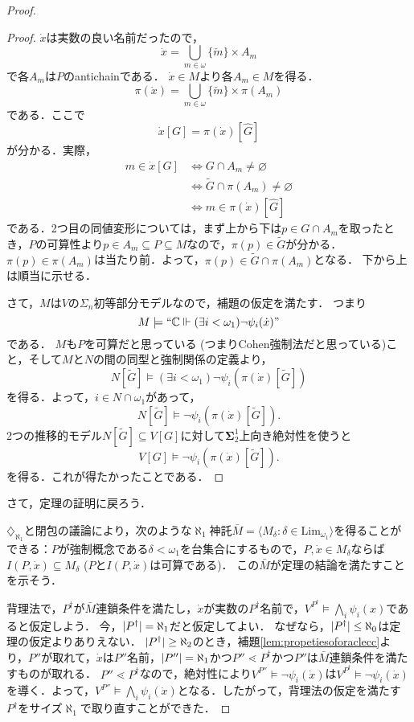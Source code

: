 \documentclass[uplatex]{jsarticle}
\newcommand{\C}{\mathbb{C}}
\newcommand{\boldsig}{\boldsymbol{\Sigma}}
\newcommand\forces{\Vdash}
\newcommand{\Limone}{\mathrm{Lim}_{\omega_1}}
\newcommand{\seq}[1]{{\langle#1\rangle}}
\DeclarePairedDelimiter\abs{\lvert}{\rvert}
\renewcommand\emptyset{\varnothing}
\renewcommand\subset{\subseteq}
\theoremstyle{definition}
\begin{document}
\begin{proof}
\begin{proof}
			$\dot{x}$は実数の良い名前だったので，
			\[
			\dot{x} = \bigcup_{m \in \omega} \{\check{m}\} \times A_m
			\]
			で各$A_m$は$P$のantichainである．
			$\dot{x} \in M$より各$A_m \in M$を得る．
			\[
				\pi(\dot{x}) = \bigcup_{m \in \omega} \{\check{m}\} \times \pi(A_m)
			\]
			である．ここで
			\[
			\dot{x}[G] = \pi(\dot{x})[\hat{G}]
			\]
			が分かる．実際，
			\begin{align*}
			m \in \dot{x}[G] &\iff G \cap A_m \ne \emptyset \\
			&\iff \tilde{G} \cap \pi(A_m) \ne \emptyset \\
			&\iff m \in \pi(\dot{x})[\hat{G}]
			\end{align*}
			である．2つ目の同値変形については，まず上から下は$p \in G \cap A_m$を取ったとき，$P$の可算性より$p \in A_m \subset P \subset M$なので，$\pi(p) \in \tilde{G}$が分かる．$\pi(p) \in \pi(A_m)$は当たり前．よって，$\pi(p) \in \tilde{G} \cap \pi(A_m)$となる．
			下から上は順当に示せる．
			
			さて，$M$は$V$の$\Sigma_n$初等部分モデルなので，補題の仮定を満たす．
			つまり\[M \models ``\C \forces (\exists i < \omega_1)\neg \psi_i(\dot{x})"\]である．
			$M$も$P$を可算だと思っている (つまりCohen強制法だと思っている)こと，そして$M$と$N$の間の同型と強制関係の定義より，
			\[
			N[\tilde{G}] \models (\exists i < \omega_1)\neg \psi_i(\pi(\dot{x})[\tilde{G}])
			\]
			を得る．よって，$i \in N \cap \omega_1$があって，
			\[
			N[\tilde{G}] \models \neg \psi_i(\pi(\dot{x})[\tilde{G}]).
			\]
			2つの推移的モデル$N[\tilde{G}] \subset V[G]$に対して$\boldsig^1_2$上向き絶対性を使うと
			\[
			V[G] \models \neg \psi_i(\pi(\dot{x})[\tilde{G}]).
			\]
			を得る．これが得たかったことである．
		\end{proof}
		
		\renewcommand\qedsymbol{$\square$}
		
		さて，定理の証明に戻ろう．
		
		$\diamondsuit_{\aleph_1}$と閉包の議論により，次のような$\aleph_1$神託$\bar{M} = \seq{M_\delta : \delta \in \Limone}$を得ることができる：$P$が強制概念である$\delta < \omega_1$を台集合にするもので，$P, \dot{x} \in M_\delta$ならば$I(P, \dot{x}) \subset M_\delta$ ($P$と$I(P, \dot{x})$は可算である)．
		この$\bar{M}$が定理の結論を満たすことを示そう．
		
		背理法で，$P^\dagger$が$\bar{M}$連鎖条件を満たし，$\dot{x}$が実数の$P^\dagger$名前で，$V^{P^\dagger} \models \bigwedge_i \psi_i(x)$であると仮定しよう．
		今，$\abs{P^\dagger} = \aleph_1$だと仮定してよい．
		なぜなら，$\abs{P^\dagger} \le \aleph_0$は定理の仮定よりありえない．
		$\abs{P^\dagger} \ge \aleph_2$のとき，補題\ref{lem:propetiesoforaclecc}より，$P''$が取れて，$\dot{x}$は$P''$名前，$\abs{P''} = \aleph_1$かつ$P'' \lessdot P^\dagger$かつ$P''$は$\bar{M}$連鎖条件を満たすものが取れる．
		$P'' \lessdot P^\dagger$なので，絶対性により$V^{P''} \models \neg\psi_i(\dot{x})$は$V^{P^\dagger} \models \neg\psi_i(\dot{x})$を導く．よって，$V^{P''} \models  \bigwedge_i \psi_i(\dot{x})$となる．したがって，背理法の仮定を満たす$P^\dagger$をサイズ$\aleph_1$で取り直すことができた．
		

\end{proof}
\end{document}
